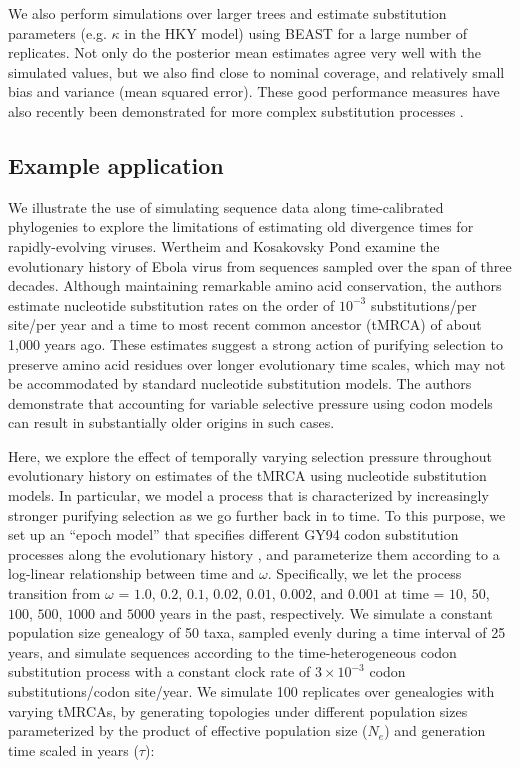 We also perform simulations over larger trees and estimate substitution parameters (e.g. $\kappa$ in the HKY model) using BEAST for a large number of replicates. 
Not only do the posterior mean estimates agree very well with the simulated values, but we also find close to nominal coverage, and relatively small bias and variance (mean squared error).
These good performance measures have also recently been demonstrated for more complex substitution processes \cite{Bielejec2014a}.

\subsection{Example application}

We illustrate the use of simulating sequence data along time-calibrated phylogenies to explore the limitations of estimating old divergence times for rapidly-evolving viruses.  
Wertheim and Kosakovsky Pond \citep{Wertheim2011} examine the evolutionary history of Ebola virus from sequences sampled over the span of three decades.
Although maintaining remarkable amino acid conservation, the authors estimate nucleotide substitution rates on the order of $10^{-3}$ substitutions/per site/per year and a time to most recent common ancestor (tMRCA) of about 1,000 years ago.
These estimates suggest a strong action of purifying selection to preserve amino acid residues over longer evolutionary time scales, which may not be accommodated by standard nucleotide substitution models.
The authors demonstrate that accounting for variable selective pressure using codon models can result in substantially older origins in such cases.

Here, we explore the effect of temporally varying selection pressure throughout evolutionary history on estimates of the tMRCA using nucleotide substitution models.
In particular, we model a process that is characterized by increasingly stronger purifying selection as we go further back in to time. 
To this purpose, we set up an ``epoch model'' that specifies different GY94 codon substitution processes along the evolutionary history \citep{Bielejec2014a}, and parameterize them according to a log-linear relationship between time and $\omega$.
Specifically, we let the process transition from $\omega$ = $1.0$, $0.2$, $0.1$, $0.02$, $0.01$, $0.002$, and $0.001$ at time = $10$, $50$, $100$, $500$, $1000$ and $5000$ years in the past, respectively.
We simulate a constant population size genealogy of 50 taxa, sampled evenly during a time interval of 25 years, and simulate sequences according to the time-heterogeneous codon substitution process with a constant clock rate of $3 \times 10^{-3}$ codon substitutions/codon site/year.
We simulate 100 replicates over genealogies with varying tMRCAs, by generating topologies under different population sizes parameterized by the product of effective population size ($N_{e}$) and generation time scaled in years ($\tau$):

